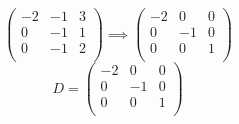 \documentclass[../practica.root.tex]{subfiles}
\begin{document}
\begin{enumerate}
\[\begin{pmatrix}
                  -2 & -1 & 3 \\
                  0  & -1 & 1 \\
                  0  & -1 & 2 \\
              \end{pmatrix}
              \implies
              \begin{pmatrix}
                  -2 & 0  & 0 \\
                  0  & -1 & 0 \\
                  0  & 0  & 1 \\
              \end{pmatrix}
          \] \[
              \boxed{D = \begin{pmatrix}
                      -2 & 0  & 0 \\
                      0  & -1 & 0 \\
                      0  & 0  & 1 \\
                  \end{pmatrix}}
          \]

\end{enumerate}
\end{document}
